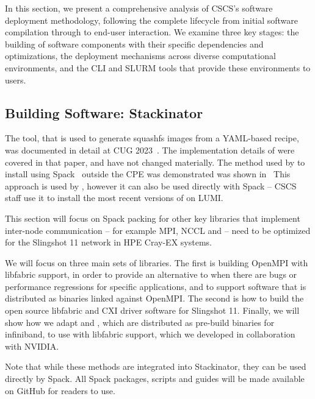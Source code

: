 In this section, we present a comprehensive analysis of CSCS's software deployment methodology, following the complete lifecycle from initial software compilation through to end-user interaction.
We examine three key stages: the building of software components with their specific dependencies and optimizations, the deployment mechanisms across diverse computational environments, and the CLI and SLURM tools that provide these environments to users.

\subsection{Building Software: Stackinator}

The  \stackinator tool, that is used to generate squashfs images from a YAML-based recipe, was documented in detail at CUG 2023~\cite{uenv2023}.
The implementation details of \stackinator were covered in that paper, and have not changed materially.
The method used by \stackinator to install \craympich using Spack~\cite{gamblin:sc15} outside the CPE was demonstrated was shown in~\cite{uenv2023} 
This approach is used by \stackinator, however it can also be used directly with Spack -- CSCS staff use it to install the most recent versions of \craympich on LUMI.

This section will focus on Spack packing for other key libraries that implement inter-node communication -- for example MPI, NCCL and \nvshmem -- need to be optimized for the Slingshot 11 network in HPE Cray-EX systems.

We will focus on three main sets of libraries. The first is building OpenMPI with libfabric support, in order to provide an alternative to \craympich when there are bugs or performance regressions for specific applications, and to support software that is distributed as binaries linked against OpenMPI. The second is how to build the open source libfabric and CXI driver software for Slingshot 11. Finally, we will show how we adapt \cufftmp and \cusolvermp, which are distributed as pre-build binaries for infiniband, to use \nvshmem with libfabric support, which we developed in collaboration with NVIDIA.

Note that while these methods are integrated into Stackinator, they can be used directly by Spack. All Spack packages, scripts and guides will be made available on GitHub for readers to use.

